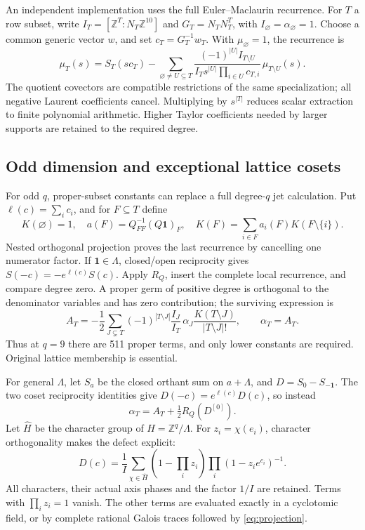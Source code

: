 \documentclass[11pt]{article}
\theoremstyle{definition}\newtheorem{definition}[theorem]{Definition}
\theoremstyle{remark}\newtheorem{remark}[theorem]{Remark}
\newcommand{\Z}{\mathbb Z}\newcommand{\Q}{\mathbb Q}\newcommand{\R}{\mathbb R}
\begin{document}
An independent implementation uses the full Euler--Maclaurin recurrence.
For \(T\) a row subset, write \(I_T=[\Z^T:N_T\Z^{10}]\) and
\(G_T=N_TN_T^T\), with \(I_\varnothing=\alpha_\varnothing=1\).
Choose a common generic vector \(w\), and set
\(c_T=G_T^{-1}w_T\). With \(\mu_\varnothing=1\), the recurrence is
\begin{equation}\label{eq:forward}
 \mu_T(s)=S_T(sc_T)
 -\sum_{\varnothing\ne U\subseteq T}
 \frac{(-1)^{|U|}I_{T\setminus U}}
 {I_Ts^{|U|}\prod_{i\in U}c_{T,i}}\,
 \mu_{T\setminus U}(s).
\end{equation}
The quotient covectors are compatible restrictions of the same specialization;
all negative Laurent coefficients cancel. Multiplying by \(s^{|T|}\)
reduces scalar extraction to finite polynomial arithmetic. Higher Taylor
coefficients needed by larger supports are retained to the required degree.

\subsection{Odd dimension and exceptional lattice cosets}
For odd \(q\), proper-subset constants can replace a full degree-\(q\)
jet calculation. Put \(\ell(c)=\sum_i c_i\), and for \(F\subseteq T\)
define
\[
 K(\varnothing)=1,\quad
 a(F)=Q_{FF}^{-1}(Q\mathbf1)_F,\quad
 K(F)=\sum_{i\in F}a_i(F)K(F\setminus\{i\}).
\]
Nested orthogonal projection proves the last recurrence by cancelling one
numerator factor. If \(\mathbf1\in\Lambda\), closed/open reciprocity
gives \(S(-c)=-e^{\ell(c)}S(c)\). Apply \(R_Q\), insert the complete
local recurrence, and compare degree zero. A proper germ of positive
degree is orthogonal to the denominator variables and has zero contribution;
the surviving expression is
\begin{equation}\label{eq:odd}
 A_T=-\frac12\sum_{J\subsetneq T}
 (-1)^{|T\setminus J|}\frac{I_J}{I_T}\,
 \alpha_J\frac{K(T\setminus J)}{|T\setminus J|!},
 \qquad \alpha_T=A_T.
\end{equation}
Thus at \(q=9\) there are 511 proper terms, and only lower constants are
required. Original lattice membership is essential.

For general \(\Lambda\), let \(S_a\) be the closed orthant sum on
\(a+\Lambda\), and \(D=S_0-S_{-\mathbf1}\). The two coset reciprocity
identities give \(D(-c)=e^{\ell(c)}D(c)\), so instead
\begin{equation}\label{eq:defect}
 \alpha_T=A_T+\tfrac12R_Q(D^{[0]}).
\end{equation}
Let \(\widehat H\) be the character group of \(H=\Z^q/\Lambda\).
For \(z_i=\chi(e_i)\), character orthogonality makes the defect explicit:
\begin{equation}\label{eq:characters}
 D(c)=\frac1I\sum_{\chi\in\widehat H}
 \left(1-\prod_i z_i\right)\prod_i(1-z_i e^{c_i})^{-1}.
\end{equation}
All characters, their actual axis phases and the factor \(1/I\) are
retained. Terms with \(\prod_i z_i=1\) vanish. The other terms are
evaluated exactly in a cyclotomic field, or by complete rational Galois
traces followed by \eqref{eq:projection}.
\end{document}
